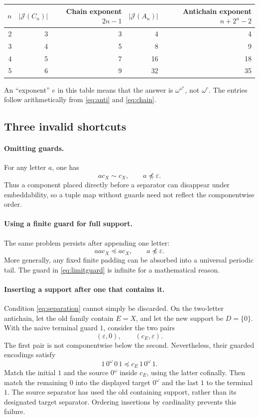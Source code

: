 \documentclass[11pt]{article}
\numberwithin{equation}{section}
\theoremstyle{plain}
\theoremstyle{definition}
\theoremstyle{remark}
\newcommand{\J}{\mathcal J}
\newcommand{\emp}{\varepsilon}
\newcommand{\sub}{\preccurlyeq}
\newcommand{\nsub}{\npreccurlyeq}
\newcommand{\equ}{\sim}
\begin{document}
\begin{center}
\begin{tabular}{@{}rrrrr@{}}
\toprule
$n$ & $|\J(C_n)|$ & Chain exponent $2n-1$ & $|\J(A_n)|$ & Antichain exponent $n+2^n-2$\\
\midrule
2 & 3 & 3 & 4 & 4\\
3 & 4 & 5 & 8 & 9\\
4 & 5 & 7 & 16 & 18\\
5 & 6 & 9 & 32 & 35\\
\bottomrule
\end{tabular}
\end{center}

An ``exponent'' $e$ in this table means that the answer is $\omega^{\omega^e}$, not $\omega^e$. The entries follow arithmetically from \eqref{eq:anti} and \eqref{eq:chain}.

\subsection{Three invalid shortcuts}

\paragraph{Omitting guards.}
For any letter $a$, one has
\[
 a c_X\equ c_X,
 \qquad a\nsub\emp.
\]
Thus a component placed directly before a separator can disappear under embeddability, so a tuple map without guards need not reflect the componentwise order.

\paragraph{Using a finite guard for full support.}
The same problem persists after appending one letter:
\[
 aa c_X\sub a c_X,
 \qquad a\nsub\emp.
\]
More generally, any fixed finite padding can be absorbed into a universal periodic tail. The guard in \eqref{eq:limitguard} is infinite for a mathematical reason.

\paragraph{Inserting a support after one that contains it.}
Condition \eqref{eq:separation} cannot simply be discarded. On the two-letter antichain, let the old family contain $E=X$, and let the new support be $D=\{0\}$. With the naive terminal guard $1$, consider the two pairs
\[
 (\emp,0),\qquad(c_E,\emp).
\]
The first pair is not componentwise below the second. Nevertheless, their guarded encodings satisfy
\begin{equation}\label{eq:negative}
 1\,0^\omega\,0\,1
 \sub
 c_E\,1\,0^\omega\,1.
\end{equation}
Match the initial $1$ and the source $0^\omega$ inside $c_E$, using the latter cofinally. Then match the remaining $0$ into the displayed target $0^\omega$ and the last $1$ to the terminal $1$. The source separator has used the old containing support, rather than its designated target separator. Ordering insertions by cardinality prevents this failure.
\end{document}

